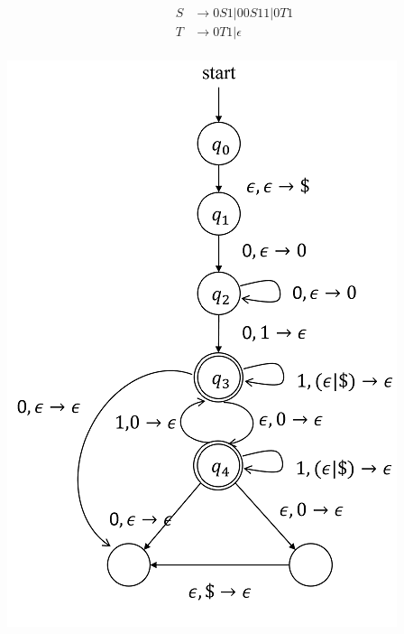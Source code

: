 \begin{align*}
	S &\to 0S1 | 00S11 | 0T1 \\
	T &\to 0T1 | \epsilon \\
\end{align*}

\begin{center}
	\includegraphics{image5}
\end{center}